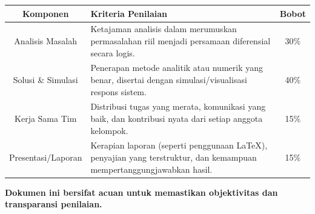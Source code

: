 \documentclass[11pt,a4paper]{article}
\begin{document}
\begin{table}[h]
\centering
\renewcommand{\arraystretch}{1.5}
\begin{tabularx}{\textwidth}{|c|X|c|}
\hline
\textbf{Komponen} & \textbf{Kriteria Penilaian} & \textbf{Bobot} \\
\hline
Analisis Masalah & Ketajaman analisis dalam merumuskan permasalahan riil menjadi persamaan diferensial secara logis. & 30\% \\
\hline
Solusi \& Simulasi & Penerapan metode analitik atau numerik yang benar, disertai dengan simulasi/visualisasi respons sistem. & 40\% \\
\hline
Kerja Sama Tim & Distribusi tugas yang merata, komunikasi yang baik, dan kontribusi nyata dari setiap anggota kelompok. & 15\% \\
\hline
Presentasi/Laporan & Kerapian laporan (seperti penggunaan \LaTeX), penyajian yang terstruktur, dan kemampuan mempertanggungjawabkan hasil. & 15\% \\
\hline
\end{tabularx}
\end{table}

\vfill
\begin{center}
\textbf{Dokumen ini bersifat acuan untuk memastikan objektivitas dan transparansi penilaian.}
\end{center}
\end{document}
